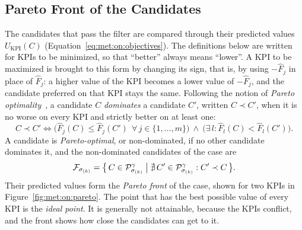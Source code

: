 
\subsection{Pareto Front of the Candidates}
\label{subsec:met:online:front}
The candidates that pass the filter are compared through their predicted
values $U_{\mathrm{KPI}}(C)$ (Equation~\eqref{eq:met:on:objectives}). The
definitions below are written for KPIs to be minimized, so that ``better''
always means ``lower''. A KPI to be maximized is brought to this form by
changing its sign, that is, by using $-\hat{F}_j$ in place of $\hat{F}_j$: a
higher value of the KPI becomes a lower value of $-\hat{F}_j$, and the
candidate preferred on that KPI stays the same. Following the notion of
\emph{Pareto optimality}~\cite{pareto1906,miettinen1999}, a candidate $C$
\emph{dominates} a candidate $C'$, written $C \prec C'$, when it is no worse
on every KPI and strictly better on at least one:
\begin{equation}
  C \prec C'
  \iff
  \bigl( \hat{F}_j(C) \le \hat{F}_j(C')\ \ \forall\, j \in
  \{1, \dots, m\} \bigr)
  \ \wedge\
  \bigl( \exists\, l : \hat{F}_l(C) < \hat{F}_l(C') \bigr).
  \label{eq:met:on:dominance}
\end{equation}
A candidate is \emph{Pareto-optimal}, or non-dominated, if no other
candidate dominates it, and the non-dominated candidates of the case are
\begin{equation}
  \mathcal{F}_{\sigma_{(k)}} = \bigl\{\, C \in
  \mathcal{P}^{\gamma}_{\sigma_{(k)}} \bigm| \nexists\, C' \in
  \mathcal{P}^{\gamma}_{\sigma_{(k)}} : C' \prec C \,\bigr\}.
  \label{eq:met:on:front}
\end{equation}
Their predicted values form the \emph{Pareto front} of the case, shown for
two KPIs in Figure~\ref{fig:met:on:pareto}. The point that has the best
possible value of every KPI is the \emph{ideal point}. It is generally not
attainable, because the KPIs conflict, and the front shows how close the
candidates can get to it.

